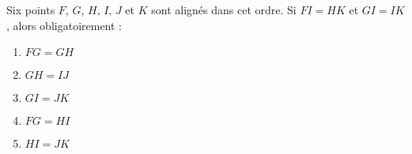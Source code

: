 Six points $F$, $G$, $H$, $I$, $J$ et $K$ sont alignés dans cet ordre. Si $FI = HK$ et $GI = IK$, alors obligatoirement :
\begin{multicols}{5}
  \begin{enumerate}[A/]
  \item $FG = GH$
  \item $GH = IJ$
  \item $GI = JK$
  \item $FG = HI$
  \item $HI = JK$
  \end{enumerate}
\end{multicols}